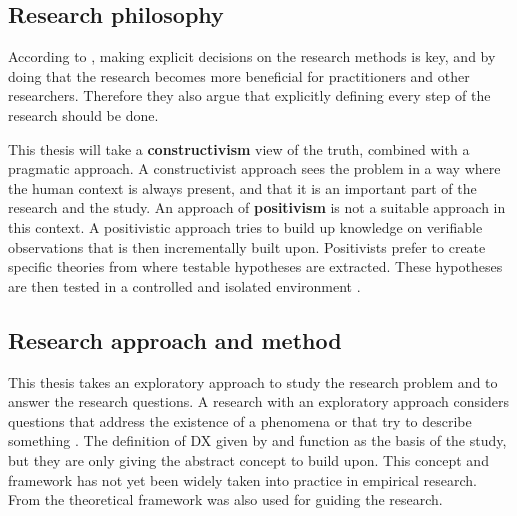 \documentclass[english, 12pt, a4paper, sci, utf8, a-1b, online]{aaltothesis}
\begin{document}
\subsection{Research philosophy} \label{section:research-philosophy}

According to \textcite{easterbrook2008selecting}, making explicit decisions on the research methods is key, and by doing that the research becomes more beneficial for practitioners and other researchers. Therefore they also argue that explicitly defining every step of the research should be done.

This thesis will take a \textbf{constructivism} view of the truth, combined with a pragmatic approach. A constructivist approach sees the problem in a way where the human context is always present, and that it is an important part of the research and the study. An approach of \textbf{positivism} is not a suitable approach in this context. A positivistic approach tries to build up knowledge on verifiable observations that is then incrementally built upon. Positivists prefer to create specific theories from where testable hypotheses are extracted. These hypotheses are then tested in a controlled and isolated environment \parencite{easterbrook2008selecting}.

\subsection{Research approach and method}

This thesis takes an exploratory approach to study the research problem and to answer the research questions. A research with an exploratory approach considers questions that address the existence of a phenomena or that try to describe something \parencite{easterbrook2008selecting}. The definition of DX given by \textcite{fagerholm-dx-concept-and-definition} and \textcite{fagerholm-doctoral-thesis} function as the basis of the study, but they are only giving the abstract concept to build upon. This concept and framework has not yet been widely taken into practice in empirical research. From \textcite{fagerholm-doctoral-thesis} the theoretical framework was also used for guiding the research.
\end{document}
